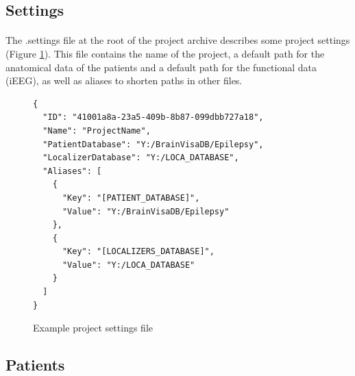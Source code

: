 \documentclass[a4paper]{article}
\begin{document}
\subsection{Settings}
\paragraph{} The .settings file at the root of the project archive describes some project settings (Figure \ref{projectSettings}). This file contains the name of the project, a default path for the anatomical data of the patients and a default path for the functional data (iEEG), as well as aliases to shorten paths in other files.
\begin{figure}[H]
\begin{lstlisting}
{
  "ID": "41001a8a-23a5-409b-8b87-099dbb727a18",
  "Name": "ProjectName",
  "PatientDatabase": "Y:/BrainVisaDB/Epilepsy",
  "LocalizerDatabase": "Y:/LOCA_DATABASE",
  "Aliases": [
    {
      "Key": "[PATIENT_DATABASE]",
      "Value": "Y:/BrainVisaDB/Epilepsy"
    },
    {
      "Key": "[LOCALIZERS_DATABASE]",
      "Value": "Y:/LOCA_DATABASE"
    }
  ]
}
\end{lstlisting}
\caption{\label{projectSettings}Example project settings file}
\end{figure}
\subsection{Patients}
\end{document}
